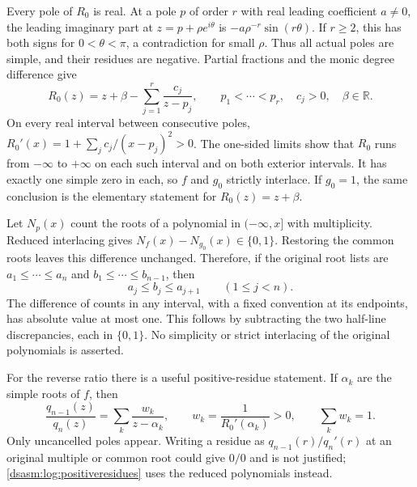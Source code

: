 \documentclass[11pt,letterpaper]{article}
\theoremstyle{remark}\newtheorem{remark}[theorem]{Remark}
\newcommand{\R}{\mathbb R}\newcommand{\C}{\mathbb C}\newcommand{\N}{\mathbb N}
\begin{document}
Every pole of $R_0$ is real. At a pole $p$ of order $r$ with real
leading coefficient $a\ne0$, the leading imaginary part at
$z=p+\rho e^{i\theta}$ is $-a\rho^{-r}\sin(r\theta)$.
If $r\ge2$, this has both signs for $0<\theta<\pi$, a contradiction
for small $\rho$. Thus all actual poles are simple, and their residues
are negative. Partial fractions and the monic degree difference give
\begin{equation}\label{dsasm:log:partialfractions}
 R_0(z)=z+\beta-\sum_{j=1}^r\frac{c_j}{z-p_j},
 \qquad p_1<\cdots<p_r,\quad c_j>0,\quad\beta\in\R.
\end{equation}
On every real interval between consecutive poles,
$R_0'(x)=1+\sum_jc_j/(x-p_j)^2>0$. The one-sided limits show that
$R_0$ runs from $-\infty$ to $+\infty$ on each such interval and
on both exterior intervals. It has exactly one simple zero in each,
so $f$ and $g_0$ strictly interlace. If $g_0=1$, the same conclusion
is the elementary statement for $R_0(z)=z+\beta$.

Let $N_p(x)$ count the roots of a polynomial in $(-\infty,x]$ with
multiplicity. Reduced interlacing gives
$N_f(x)-N_{g_0}(x)\in\{0,1\}$. Restoring the common roots leaves this
difference unchanged. Therefore, if the original root lists are
$a_1\le\cdots\le a_n$ and $b_1\le\cdots\le b_{n-1}$, then
\begin{equation}\label{dsasm:log:weakinterlace}
 a_j\le b_j\le a_{j+1}\qquad(1\le j<n).
\end{equation}
The difference of counts in any interval, with a fixed convention at
its endpoints, has absolute value at most one. This follows by
subtracting the two half-line discrepancies, each in $\{0,1\}$.
No simplicity or strict interlacing of the original polynomials is
asserted.

For the reverse ratio there is a useful positive-residue statement.
If $\alpha_k$ are the simple roots of $f$, then
\begin{equation}\label{dsasm:log:positiveresidues}
 \frac{q_{n-1}(z)}{q_n(z)}
 =\sum_k\frac{w_k}{z-\alpha_k},\qquad
 w_k=\frac1{R_0'(\alpha_k)}>0,\qquad\sum_kw_k=1.
\end{equation}
Only uncancelled poles appear. Writing a residue as
$q_{n-1}(r)/q_n'(r)$ at an original multiple or common root could give
$0/0$ and is not justified; \eqref{dsasm:log:positiveresidues} uses the reduced
polynomials instead.
\end{document}
